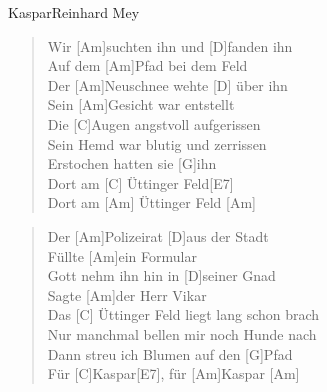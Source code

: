 \begin{song}{Kaspar}{Reinhard Mey}
    \begin{verse}
        Wir [Am]suchten ihn und [D]fanden ihn \\
        Auf dem [Am]Pfad bei dem Feld \\
        Der [Am]Neuschnee wehte [D] \"uber ihn \\
        Sein [Am]Gesicht war entstellt \\
        Die [C]Augen angstvoll aufgerissen \\
        [Am]Sein Hemd war blutig und zerrissen \\
        [D]Erstochen hatten sie [G]ihn \\
        Dort am [C] \"Uttinger Feld[E7] \\
        Dort am [Am] \"Uttinger Feld \hspace{1em}[Am]
    \end{verse}

    \begin{verse}
         Der [Am]Polizeirat [D]aus der Stadt \\
        F\"ullte [Am]ein Formular \\
        [Am]Gott nehm ihn hin in [D]seiner Gnad \\
        Sagte [Am]der Herr Vikar \\
        Das [C] \"Uttinger Feld liegt lang schon brach \\
        [Am]Nur manchmal bellen mir noch Hunde nach \\
        [D]Dann streu ich Blumen auf den [G]Pfad \\
        F\"ur [C]Kaspar[E7], f\"ur [Am]Kaspar \hspace{1em}[Am]
    \end{verse}

\end{song}
